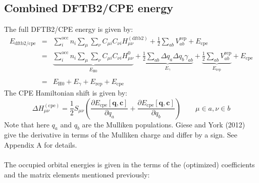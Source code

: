 \documentclass{article}
\numberwithin{equation}{section}
\begin{document}
\subsection{Combined DFTB2/CPE energy}
The full DFTB2/CPE energy is given by:
\begin{eqnarray}
    E_\mathrm{{dftb2/cpe}} &=& \sum_i^\mathrm{occ} n_i \sum_{\mu} \sum_{\nu}  C_{\mu i} C_{\nu i} H_{\mu\nu}^{\mathrm{(dftb2)}}  
    + \frac{1}{2} \sum_{ab} V^\mathrm{rep}_{ab}
    + E_{\mathrm{cpe}} \nonumber\\
    &=& \underbrace{\sum_i^\mathrm{occ} n_i  \sum_\mu \sum_\nu C_{\mu i}  C_{\nu i} H^0_{\mu\nu}}_{E_\mathrm{H0}}
        + \underbrace{\frac{1}{2} \sum_{ab} \Delta q_a \Delta q_b \gamma_{ab}}_{E_\gamma}
    + \underbrace{\frac{1}{2} \sum_{ab} V^\mathrm{rep}_{ab}}_{E_\mathrm{rep}}
 + E_{\mathrm{cpe}}\\\nonumber\\
&=&  E_\mathrm{H0} + E_\gamma + E_\mathrm{rep} + E_\mathrm{cpe}\label{eq:shorthand}
\end{eqnarray}
The CPE Hamiltonian shift is given by:\cite{gieseyork2012}
\begin{equation}
    \Delta H_{\mu\nu}^{\mathrm{(cpe)}} =  \frac{1}{2} S_{\mu\nu} \left(
    \frac{\partial E_{\mathrm{cpe}}\left[\mathbf{q}, \mathbf{c}\right]}{\partial q_a} +
    \frac{\partial E_{\mathrm{cpe}}\left[\mathbf{q}, \mathbf{c}\right]}{\partial q_b}
\right) \qquad \mu \in a, \nu \in b
\end{equation}
Note that here $q_a$ and $q_b$ are the Mulliken populations. Giese and York (2012) give the derivative in terms of the Mulliken charge and differ by a sign. See Appendix A for details.
\\\\The occupied orbital energies is given in the terms of the (optimized) coefficients and the matrix elements mentioned previously:
\end{document}
